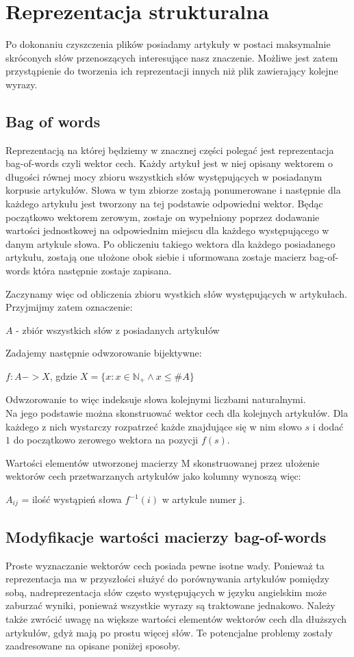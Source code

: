 \section{Reprezentacja strukturalna}
Po dokonaniu czyszczenia plików posiadamy artykuły w postaci maksymalnie skróconych słów przenoszących interesujące nasz znaczenie. Możliwe jest zatem przystąpienie do tworzenia ich reprezentacji innych niż plik zawierający kolejne wyrazy.
\subsection{Bag of words}
Reprezentacją na której będziemy w znacznej części polegać jest reprezentacja bag-of-words czyli wektor cech. Każdy artykuł jest w niej opisany wektorem o długości równej mocy zbioru wszystkich słów występujących w posiadanym korpusie artykułów. Słowa w tym zbiorze zostają ponumerowane i następnie dla każdego artykułu jest tworzony na tej podstawie odpowiedni wektor. Będąc początkowo wektorem zerowym, zostaje on wypełniony poprzez dodawanie wartości jednostkowej na odpowiednim miejscu dla każdego występującego w danym artykule słowa. Po obliczeniu takiego wektora dla każdego posiadanego artykułu, zostają one ułożone obok siebie i uformowana zostaje macierz bag-of-words która następnie zostaje zapisana.

Zaczynamy więc od obliczenia zbioru wystkich słów występujących w artykułach.
Przyjmijmy zatem oznaczenie:
\begin{center}
$A$ - zbiór wszystkich słów z posiadanych artykułów
\end{center}

Zadajemy następnie odwzorowanie bijektywne:
\begin{center}
$f:A->X$, gdzie $X = \{ x: x \in \mathbb{N}_{+} \land x \leq \#A \} $
\end{center}
Odwzorowanie to więc indeksuje słowa kolejnymi liczbami naturalnymi.\\ 
Na jego podstawie można skonstruować wektor cech dla kolejnych artykułów. Dla każdego z nich wystarczy rozpatrzeć każde znajdujące się w nim słowo $s$ i dodać $1$ do początkowo zerowego wektora na pozycji $f(s)$.

Wartości elementów utworzonej macierzy M skonstruowanej przez ułożenie wektorów cech przetwarzanych artykułów jako kolumny wynoszą więc:
\begin{center}
$A_{ij}$ = ilość wystąpień słowa $f^{-1}(i)$ w artykule numer j.
\end{center}
\subsection{Modyfikacje wartości macierzy bag-of-words}
Proste wyznaczanie wektorów cech posiada pewne isotne wady. Ponieważ ta reprezentacja ma w przyszłości służyć do porównywania artykułów pomiędzy sobą, nadreprezentacja słów często występujących w języku angielskim może zaburzać wyniki, ponieważ wszystkie wyrazy są traktowane jednakowo. Należy także zwrócić uwagę na większe wartości elementów wektorów cech dla dłuższych artykułów, gdyż mają po prostu więcej słów. Te potencjalne problemy zostały zaadresowane na opisane poniżej sposoby.

